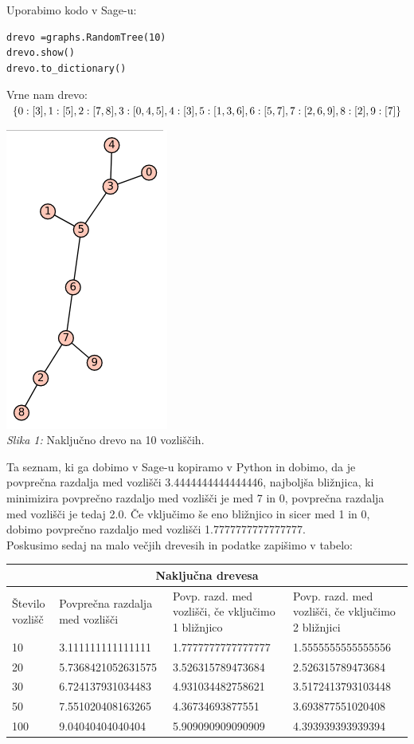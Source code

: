 \documentclass[a4paper,10pt]{article}
\begin{document}
Uporabimo kodo v Sage-u:
\begin{verbatim}
drevo =graphs.RandomTree(10)
drevo.show()
drevo.to_dictionary()
\end{verbatim}
Vrne nam drevo:$ \lbrace 0: [3], 1: [5], 2: [7, 8], 3: [0, 4, 5], 4: [3], \\ 5: [1, 3, 6], 6: [5, 7], 7: [2, 6, 9], 8: [2], 9: [7] \rbrace$
\begin{center}
\includegraphics[scale = 0.6]{graf1}\\ 
\scriptsize{\textit{Slika 1: } Naključno drevo na 10 vozliščih.}
\end{center}
Ta seznam, ki ga dobimo v Sage-u kopiramo v Python in dobimo, da je povprečna razdalja med vozlišči 3.4444444444444446, najboljša bližnjica, ki minimizira povprečno razdaljo med vozlišči je med 7 in 0, povprečna razdalja med vozlišči je tedaj 2.0. Če vključimo še eno bližnjico in sicer med 1 in 0, dobimo povprečno razdaljo med vozlišči 1.7777777777777777.
\\[0.5cm]
Poskusimo sedaj na malo večjih drevesih in podatke zapišimo v tabelo:
\\[0.5cm]
\begin{tabular}{ |p{3cm}||p{3cm}|p{3cm}|p{3cm}|  }
 \hline
 \multicolumn{4}{|c|}{Naključna drevesa} \\
 \hline
 Število vozlišč& Povprečna razdalja med vozlišči &Povp. razd. med vozlišči, če vključimo 1 bližnjico&Povp. razd. med vozlišči, če vključimo 2 bližnjici\\
 \hline
 10   & 3.111111111111111    &1.7777777777777777&   1.5555555555555556\\
20&  5.7368421052631575  & 3.526315789473684   &2.526315789473684\\
 30 &6.724137931034483 & 4.931034482758621& 3.5172413793103448\\
 50    &7.551020408163265 & 4.36734693877551& 3.693877551020408\\
 100&  9.04040404040404  & 5.909090909090909&4.393939393939394\\
 \hline
\end{tabular}
\end{document}
